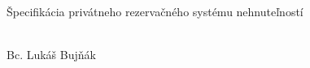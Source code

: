 \documentclass[12pt, oneside]{article}
\begin{document}
     
  	\pagestyle{empty}

	\begin{center}
    	\sc\large\text{ }
		\vfill
  		\LARGE Špecifikácia privátneho rezervačného systému nehnuteľností
	\end{center}

	\vfill
	{\sc\large \noindent \\ Bc. Lukáš Bujňák}
	\cleardoublepage

	\tableofcontents

	\pagestyle{plain}
	
	\newpage
	

    \newpage
    

    \newpage
    

	\newpage
	

	\newpage
	

	\newpage
	
\end{document}
